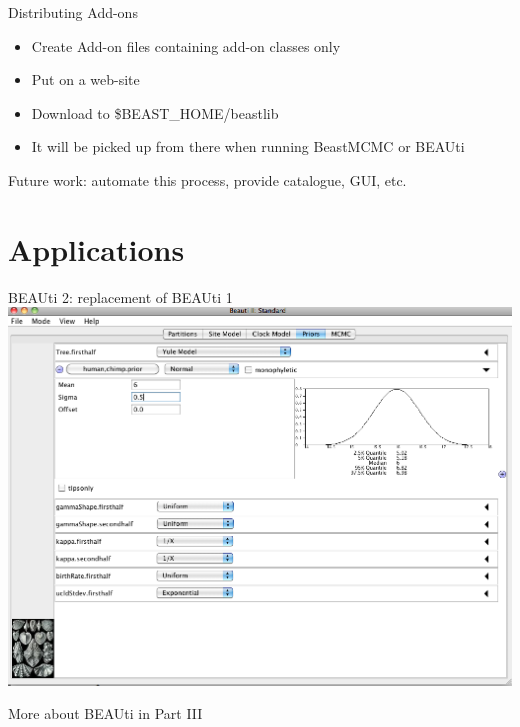 \documentclass{beamer}
\theoremstyle{definition}
\begin{document}
\begin{frame}{Distributing Add-ons}

\begin{itemize}
\item Create Add-on files containing add-on classes only
\item Put on a web-site
\item Download to \$BEAST\_HOME/beastlib
\item It will be picked up from there when running BeastMCMC or BEAUti
\end{itemize}

Future work: automate this process, provide catalogue, GUI, etc.

\end{frame}


\section{Applications}

\begin{frame}{BEAUti 2: replacement of BEAUti 1}
\includegraphics[width=\textwidth]{BEAUti.png}

More about BEAUti in Part III
\end{frame}
\end{document}
